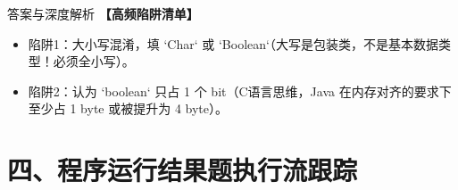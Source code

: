 \documentclass[12pt, a4paper]{ctexart}
\begin{document}
\begin{enumerate}[label=\textbf{\arabic*.}]
\begin{bluebox}{答案与深度解析}
		      \textbf{【高频陷阱清单】}
		      \begin{itemize}[leftmargin=*, nosep]
			      \item 陷阱1：大小写混淆，填 `Char` 或 `Boolean`（大写是包装类，不是基本数据类型！必须全小写）。
			      \item 陷阱2：认为 `boolean` 只占 1 个 bit（C语言思维，Java 在内存对齐的要求下至少占 1 byte 或被提升为 4 byte）。
		      \end{itemize}
	      \end{bluebox}
\end{enumerate}

\newpage
\section{四、程序运行结果题执行流跟踪}
\end{document}
